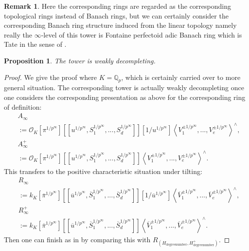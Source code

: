 \documentclass[11pt]{book}
\newtheorem{proposition}[theorem]{Proposition}
\theoremstyle{definition}
\newtheorem{remark}[theorem]{Remark}
\numberwithin{equation}{section}
\begin{document}
\begin{remark}
Here the corresponding rings are regarded as the corresponding topological rings instead of Banach rings, but we can certainly consider the corresponding Banach ring structure induced from the linear topology namely really the $\infty$-level of this tower is Fontaine perfectoid adic Banach ring which is Tate in the sense of \cite[Definition 3.1.1]{12KL2}.	
\end{remark}



\begin{proposition}
The tower is weakly decompleting.	
\end{proposition}


\begin{proof}
We give the proof where $K=\mathbb{Q}_p$, which is certainly carried over to more general situation. The corresponding tower is actually weakly decompleting once one considers the corresponding presentation as above for the corresponding ring of definition:
\begin{align}
&A_\infty\\
&:=\mathcal{O}_K[\pi^{1/p^\infty}][[u^{1/p^\infty},S_1^{1/p^\infty},...,S_d^{1/p^\infty}]][1/u^{1/p^\infty}]\left<V_1^{\pm 1/p^\infty},...,V_e^{\pm 1/p^\infty}\right>^\wedge,\\
&A_\infty^+\\
&:=\mathcal{O}_K[\pi^{1/p^\infty}][[u^{1/p^\infty},S_1^{1/p^\infty},...,S_d^{1/p^\infty}]]\left<V_1^{\pm 1/p^\infty},...,V_e^{\pm 1/p^\infty}\right>^\wedge.
\end{align}
This transfers to the positive characteristic situation under tilting:
\begin{align}
&R_\infty\\
&:={k}_K[\overline{\pi}^{1/p^\infty}][[\overline{u}^{1/p^\infty},\overline{S}_1^{1/p^\infty},...,\overline{S}_d^{1/p^\infty}]][1/\overline{u}^{1/p^\infty}]\left<\overline{V}_1^{\pm 1/p^\infty},...,\overline{V}_e^{\pm 1/p^\infty}\right>^\wedge,\\
&R_\infty^+\\
&:={k}_K[\overline{\pi}^{1/p^\infty}][[\overline{u}^{1/p^\infty},\overline{S}_1^{1/p^\infty},...,\overline{S}_d^{1/p^\infty}]]\left<\overline{V}_1^{\pm 1/p^\infty},...,\overline{V}_e^{\pm 1/p^\infty}\right>^\wedge.
\end{align}	
Then one can finish as in \cite[Lemma 7.1.2]{12KL2} by comparing this with $R_{(H_\text{degreenumber},H_\text{degreenumber}^+)}$.
\end{proof}
\end{document}
